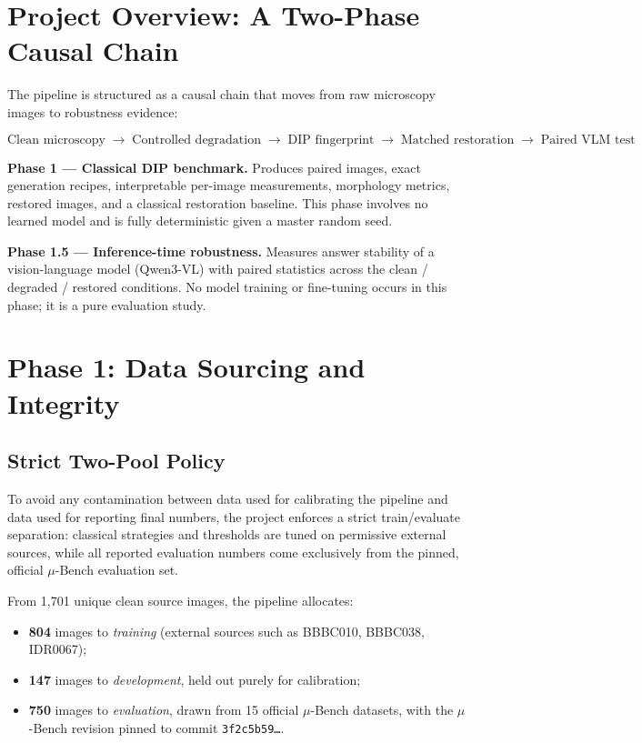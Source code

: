 \documentclass[11pt]{article}
\begin{document}
\section{Project Overview: A Two-Phase Causal Chain}

The pipeline is structured as a causal chain that moves from raw microscopy images
to robustness evidence:

\[
\text{Clean microscopy} \;\rightarrow\; \text{Controlled degradation} \;\rightarrow\;
\text{DIP fingerprint} \;\rightarrow\; \text{Matched restoration} \;\rightarrow\;
\text{Paired VLM test}
\]

\textbf{Phase 1 --- Classical DIP benchmark.} Produces paired images, exact generation
recipes, interpretable per-image measurements, morphology metrics, restored images, and
a classical restoration baseline. This phase involves no learned model and is fully
deterministic given a master random seed.

\textbf{Phase 1.5 --- Inference-time robustness.} Measures answer stability of a
vision-language model (Qwen3-VL) with paired statistics across the clean / degraded /
restored conditions. No model training or fine-tuning occurs in this phase; it is a
pure evaluation study.

\section{Phase 1: Data Sourcing and Integrity}

\subsection{Strict Two-Pool Policy}

To avoid any contamination between data used for calibrating the pipeline and data used
for reporting final numbers, the project enforces a strict train/evaluate separation:
classical strategies and thresholds are tuned on permissive external sources, while all
reported evaluation numbers come exclusively from the pinned, official $\mu$-Bench
evaluation set.

From 1{,}701 unique clean source images, the pipeline allocates:

\begin{itemize}[leftmargin=1.4em]
    \item \textbf{804} images to \textit{training} (external sources such as BBBC010,
    BBBC038, IDR0067);
    \item \textbf{147} images to \textit{development}, held out purely for calibration;
    \item \textbf{750} images to \textit{evaluation}, drawn from 15 official $\mu$-Bench
    datasets, with the $\mu$-Bench revision pinned to commit \texttt{3f2c5b59\ldots}.
\end{itemize}
\end{document}
